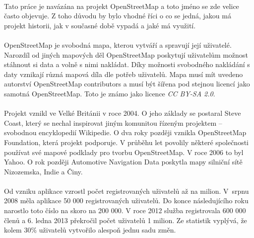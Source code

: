 \documentclass[11pt,a4paper,titlepage,oneside]{book}
\begin{document}
		\paragraph{} Tato práce je navázána na projekt OpenStreetMap a toto jméno se zde velice často objevuje. Z toho důvodu by bylo vhodné říci o co se jedná, jakou má projekt historii, jak v současné době vypadá a jaké má využití. 





		\paragraph{} OpenStreetMap je svobodná mapa, kterou vytváří a spravují její uživatelé. Narozdíl od jiných mapových děl OpenStreetMap poskytují uživatelům možnost stáhnout si data a volně s nimi nakládat. Díky možnosti svobodného nakládání s daty vznikají různá mapová díla dle potřeb uživatelů. Mapa musí mít uvedeno autorství OpenStreetMap contributors a musí být šířena pod stejnou licencí jako samotná OpenStreetMap. Toto je známo jako licence \textit{CC BY-SA 2.0}\cite{creative_commons}.
		\paragraph{}Projekt vznikl ve Velké Británii v roce 2004. O jeho základy se postaral Steve Coast, který se nechal inspirovat jiným komunitou řízeným projektem -- svobodnou encyklopedií Wikipedie. O dva roky později vznikla OpenStreetMap Foundation, která projekt podporuje. V průběhu let povolily některé společnosti používat své mapové podklady pro tvorbu OpenStreetMap. V roce 2006 to byl Yahoo. O rok později Automotive Navigation Data poskytla mapy silniční sítě Nizozemska, Indie a Činy. 
		\paragraph{} Od vzniku aplikace vzrostl počet registrovaných uživatelů až na milion. V~srpnu 2008 měla aplikace 50 000 registrovaných uživatelů. Do konce násle\-dujícího roku narostlo toto číslo na skoro na  200 000. V roce 2012 služba registrovala 600 000 členů a 6. ledna 2013 překročil počet uživatelů 1 milion. Ze statistik vyplývá, že kolem 30\% uživatelů vytvořilo alespoň jednu sadu změn\cite{neis}.
\end{document}
